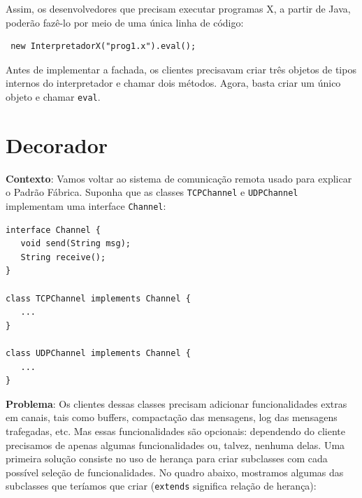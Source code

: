 \documentclass[
  11pt,
  twoside]{book}
\newcommand{\passthrough}[1]{#1}
\begin{document}
Assim, os desenvolvedores que precisam executar programas X, a partir de
Java, poderão fazê-lo por meio de uma única linha de código:

\begin{lstlisting}
 new InterpretadorX("prog1.x").eval();
\end{lstlisting}

Antes de implementar a fachada, os clientes precisavam criar três
objetos de tipos internos do interpretador e chamar dois métodos. Agora,
basta criar um único objeto e chamar \passthrough{\lstinline!eval!}.

\hypertarget{decorador}{%
\section{Decorador}\label{decorador}}

 

\textbf{Contexto}: Vamos voltar ao sistema de comunicação remota usado
para explicar o Padrão Fábrica. Suponha que as classes
\passthrough{\lstinline!TCPChannel!} e
\passthrough{\lstinline!UDPChannel!} implementam uma interface
\passthrough{\lstinline!Channel!}:

\begin{lstlisting}
interface Channel {
   void send(String msg);
   String receive();
}

class TCPChannel implements Channel {
   ...
}

class UDPChannel implements Channel {
   ...
}
\end{lstlisting}

\textbf{Problema}: Os clientes dessas classes precisam adicionar
funcionalidades extras em canais, tais como buffers, compactação das
mensagens, log das mensagens trafegadas, etc. Mas essas funcionalidades
são opcionais: dependendo do cliente precisamos de apenas algumas
funcionalidades ou, talvez, nenhuma delas. Uma primeira solução consiste
no uso de herança para criar subclasses com cada possível seleção de
funcionalidades. No quadro abaixo, mostramos algumas das subclasses que
teríamos que criar (\passthrough{\lstinline!extends!} significa relação
de herança):
\end{document}
